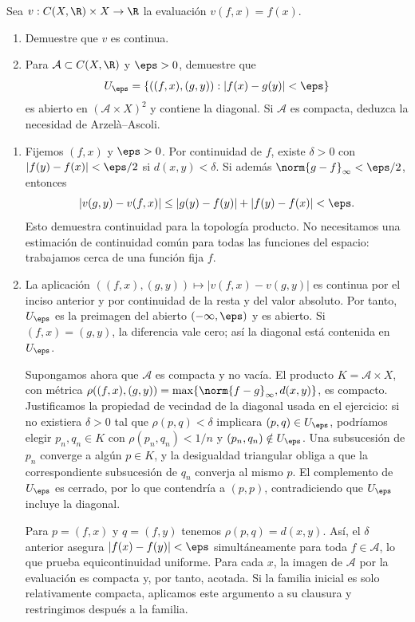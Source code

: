 \begin{ejercicio}
Sea $v:C(X,\R)\times X\to\R$ la evaluación $v(f,x)=f(x)$.
\begin{enumerate}[label=(\roman*)]
\item Demuestre que $v$ es continua.
\item Para $\mathcal A\subset C(X,\R)$ y $\eps>0$, demuestre que
\[
 U_\eps=\{((f,x),(g,y)):|f(x)-g(y)|<\eps\}
\]
es abierto en $(\mathcal A\times X)^2$ y contiene la diagonal. Si $\mathcal A$ es compacta, deduzca la necesidad de Arzelà--Ascoli.
\end{enumerate}
\end{ejercicio}
\begin{solucion}
\begin{enumerate}[label=(\roman*)]
\item Fijemos $(f,x)$ y $\eps>0$. Por continuidad de $f$, existe $\delta>0$ con $|f(y)-f(x)|<\eps/2$ si $d(x,y)<\delta$. Si además $\norm{g-f}_\infty<\eps/2$, entonces
\[
 |v(g,y)-v(f,x)|\le|g(y)-f(y)|+|f(y)-f(x)|<\eps.
\]
Esto demuestra continuidad para la topología producto. No necesitamos una estimación de continuidad común para todas las funciones del espacio: trabajamos cerca de una función fija $f$.
\item La aplicación $((f,x),(g,y))\mapsto|v(f,x)-v(g,y)|$ es continua por el inciso anterior y por continuidad de la resta y del valor absoluto. Por tanto, $U_\eps$ es la preimagen del abierto $(-\infty,\eps)$ y es abierto. Si $(f,x)=(g,y)$, la diferencia vale cero; así la diagonal está contenida en $U_\eps$.

Supongamos ahora que $\mathcal A$ es compacta y no vacía. El producto $K=\mathcal A\times X$, con métrica
$\rho((f,x),(g,y))=\max\{\norm{f-g}_\infty,d(x,y)\}$, es compacto. Justificamos la propiedad de vecindad de la diagonal usada en el ejercicio: si no existiera $\delta>0$ tal que $\rho(p,q)<\delta$ implicara $(p,q)\in U_\eps$, podríamos elegir $p_n,q_n\in K$ con $\rho(p_n,q_n)<1/n$ y $(p_n,q_n)\notin U_\eps$. Una subsucesión de $p_n$ converge a algún $p\in K$, y la desigualdad triangular obliga a que la correspondiente subsucesión de $q_n$ converja al mismo $p$. El complemento de $U_\eps$ es cerrado, por lo que contendría a $(p,p)$, contradiciendo que $U_\eps$ incluye la diagonal.

Para $p=(f,x)$ y $q=(f,y)$ tenemos $\rho(p,q)=d(x,y)$. Así, el $\delta$ anterior asegura $|f(x)-f(y)|<\eps$ simultáneamente para toda $f\in\mathcal A$, lo que prueba equicontinuidad uniforme. Para cada $x$, la imagen de $\mathcal A$ por la evaluación es compacta y, por tanto, acotada. Si la familia inicial es solo relativamente compacta, aplicamos este argumento a su clausura y restringimos después a la familia.
\end{enumerate}
\end{solucion}


